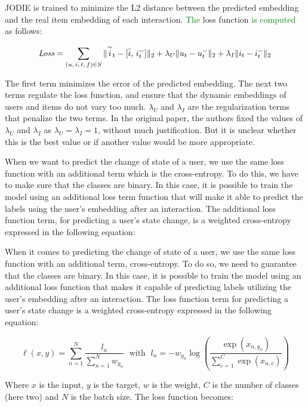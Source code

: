 JODIE is trained to minimize the L2 distance between the predicted embedding and the real item embedding of each interaction. %
\textcolor{green}{The} loss function \textcolor{green}{is computed} as follows:

\begin{equation}
    \textit{Loss} = \sum_{(u,\,i,\,t,\,f) \in S} \| \overset{\sim}{i}_t - [\Bar{i},\,i_t^-] \|_2 + \lambda_U \|u_t - u_t^-\|_2 + \lambda_I \|i_t - i_t^-\|_2
\end{equation}

The first term minimizes the error of the predicted embedding. The next two terms regulate the loss function, and ensure that  
the dynamic embeddings of users and items do not vary too much. $\lambda_U$ and $\lambda_I$ are the regularization terms that penalize the two terms. In the original paper, the authors fixed the values of $\lambda_U$ and $\lambda_I$ as $\lambda_U = \lambda_I = 1$, without much justification. But it is unclear whether this is the best value or if another value would be more appropriate. 

When we want to predict the change of state of a user, we use the same loss function with an additional term which is the cross-entropy. To do this, we have to make sure that the classes are binary. In this case, it is possible to train the model using an additional loss term function that will make it able to predict the labels using the user's embedding after an interaction. The additional loss function term, for predicting a user's state change, is a weighted cross-entropy expressed in the following equation:

When it comes to predicting the change of state of a user, we use the same loss function with an additional term, cross-entropy. To do so, we need to guarantee that the classes are binary. In this case, it is possible to train the model using an additional loss function that makes it capable of predicting labels utilizing the user's embedding after an interaction. The loss function  term for predicting a user's state change is a weighted cross-entropy expressed in the following equation:

\begin{equation}
    \ell(x,y) = \sum_{n=1}^N \frac{l_n}{\sum_{n=1}^N w_{y_n}} \; \text{ with } \;
    l_n = -w_{y_n} \log \left ( \frac{\exp(x_{n,y_n})}{\sum_{c=1}^C \exp(x_{n,c})} \right )
\end{equation}

Where $x$ is the input, $y$ is the target, $w$ is the weight, $C$ is the number of classes (here two) and $N$ is the batch size. The loss function becomes:

